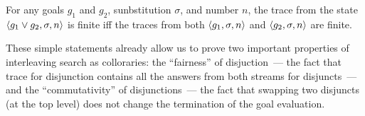 \begin{lemma}
\label{lem:disj_termination}
For any goals $g_1$ and $g_2$, sunbstitution $\sigma$, and number $n$, the trace from the state $\left<{g_1 \vee g_2, \sigma, n}\right>$ is finite iff the traces from both $\left<{g_1, \sigma, n}\right>$ and $\left<{g_2, \sigma, n}\right>$ are finite.
\end{lemma}

These simple statements already allow us to prove two important properties of interleaving search as colloraries: the ``fairness'' of disjuction~--- the fact that trace for disjunction contains all the answers from both streams for disjuncts~--- and the ``commutativity'' of disjunctions~--- the fact that swapping two disjuncts (at the top level) does not change the termination of the goal evaluation. 
